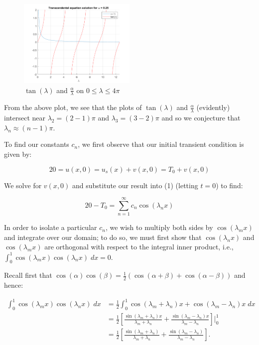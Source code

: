 \begin{solution}
    \begin{figure}[h]
        \centering
        \includegraphics[width=0.5\textwidth]{problem1_transcendental_eigenvalues.png}
        \caption{$\tan(\lambda)$ and $\frac{\alpha}{\lambda}$ on $0 \le \lambda \le 4 \pi$}
    \end{figure}

    \pagebreak

    From the above plot, we see that the plots of $\tan(\lambda)$ and $\frac{\alpha}{\lambda}$ (evidently) intersect near 
    $\lambda_2 = (2 - 1)\pi$ and $\lambda_3 = (3 - 2) \pi$ and so we conjecture that $\lambda_n \approx (n - 1) \pi$.

    To find our constants $c_n$, we first observe that our initial transient condition is given by:

    $$
        20 = u(x, 0) = u_s(x) + v(x, 0) = T_0 + v(x, 0)
    $$
    
    We solve for $v(x, 0)$ and substitute our result into (1) (letting $t = 0$) to find:

    \begin{equation}
        20 - T_0 = \sum_{n=1}^{\infty}{c_n \cos{(\lambda_n x)}}
    \end{equation}

    In order to isolate a particular $c_n$, we wish to multiply both sides by $\cos{(\lambda_m x)}$ and integrate over our domain;
    to do so, we must first show that $\cos{(\lambda_n x)}$ and $\cos{(\lambda_m x)}$ are orthogonal with respect to the integral 
    inner product, i.e., $\int_{0}^{1}{\cos{(\lambda_m x)}\cos{(\lambda_n x)}\; dx} = 0$.

    Recall first that $\cos{(\alpha) \cos{(\beta)}} = \frac{1}{2}\left( \cos(\alpha + \beta) + \cos(\alpha - \beta) \right)$
    and hence:

    \begin{align*}
        \int_{0}^{1}{\cos{(\lambda_m x)}\cos{(\lambda_n x)}\; dx} &= \frac{1}{2} \int_{0}^{1}{\cos{(\lambda_m + \lambda_n) x} + \cos{(\lambda_m - \lambda_n) x}\; dx} \\
                                                                  &= \frac{1}{2} \left[ \frac{\sin{(\lambda_m + \lambda_n)x}}{\lambda_m + \lambda_n} + \frac{\sin{(\lambda_m - \lambda_n)x}}{\lambda_m - \lambda_n} \right] \bigg\vert_{0}^{1} \\
                                                                  &= \frac{1}{2} \left[ \frac{\sin{(\lambda_m + \lambda_n)}}{\lambda_m + \lambda_n} + \frac{\sin{(\lambda_m - \lambda_n)}}{\lambda_m - \lambda_n} \right].
    \end{align*}


\end{solution}
